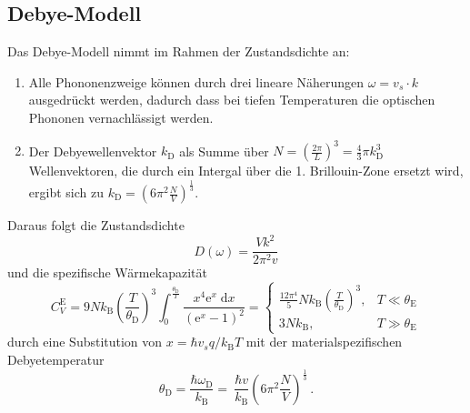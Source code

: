 \subsection{Debye-Modell}
Das Debye-Modell nimmt im Rahmen der Zustandsdichte an:
\begin{enumerate}
    \item Alle Phononenzweige können durch drei lineare Näherungen $\omega = v_s \cdot k$ ausgedrückt werden, dadurch dass bei tiefen Temperaturen die optischen Phononen vernachlässigt werden.
    \item Der Debyewellenvektor $k_\text{D}$ als Summe über $N = \left(\frac{2\pi}{L}\right)^3   = \frac{4}{3} \pi k_\text{D}^3$ Wellenvektoren, die durch ein Intergal über die 1. Brillouin-Zone ersetzt wird, ergibt sich zu $k_\text{D} = \left(6\pi^2\frac{N}{V}\right)^{\frac{1}{3}}$.
\end{enumerate}
Daraus folgt die Zustandsdichte 
\begin{equation}
    D(\omega) = \frac{Vk^2}{2\pi^2v}
\end{equation}
und die spezifische Wärmekapazität
\begin{equation}
    C_V^\text{E} = 9Nk_\text{B} \left(\frac{T}{\theta_\text{D}}\right)^3 \int_0^{\frac{\theta_\text{D}}{T}} 
    \frac{x^4\text{e}^x \; \text{d}x}{(\text{e}^x - 1)^2} = 
    \begin{cases}
        \frac{12\pi^4}{5}Nk_\text{B}\left(\frac{T}{\theta_\text{D}}\right)^3, & T \ll \theta_\text{E} \\
        3Nk_\text{B} , & T \gg \theta_\text{E}
    \end{cases}
\end{equation}
durch eine Substitution von $x=\hbar v_s q /k_\text{B} T$ mit der materialspezifischen Debyetemperatur 
\begin{equation}
    \label{eqn:Debye}
    \theta_\text{D} = \frac{\hbar\omega_\text{D}}{k_\text{B}} = \
    \frac{\hbar v}{k_\text{B}} \left(6\pi^2\frac{N}{V}\right)^{\frac{1}{3}}\, .
\end{equation}
